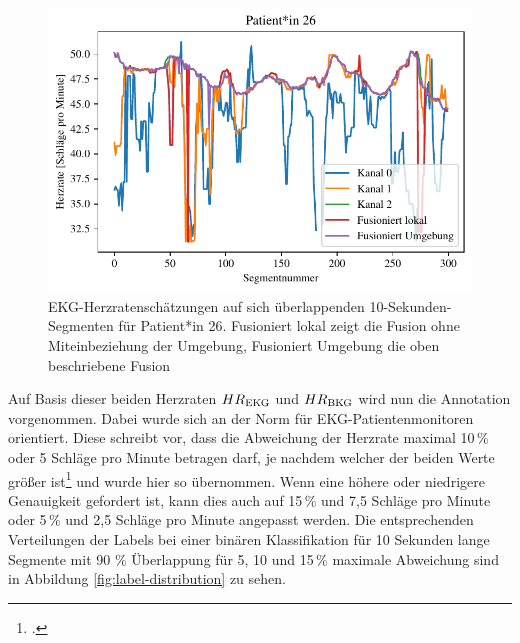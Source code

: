 	\begin{figure}[H]
		\centering
		\includegraphics{pic/ecg-patient-26.pdf}
		\caption[\ac{EKG}-Herzratenschätzungen auf sich überlappenden 10-Sekunden-Segmenten für Patient*in 26]{\ac{EKG}-Herzratenschätzungen auf sich überlappenden 10-Sekunden-Segmenten für Patient*in 26. Fusioniert lokal zeigt die Fusion ohne Miteinbeziehung der Umgebung, Fusioniert Umgebung die oben beschriebene Fusion}
		\label{fig:ecg-patient-26}
	\end{figure}


	Auf Basis dieser beiden Herzraten $HR\textsubscript{EKG}$ und $HR\textsubscript{BKG}$ wird nun die Annotation vorgenommen. Dabei wurde sich an der Norm für \ac{EKG}-Patientenmonitoren orientiert. Diese schreibt vor, dass die Abweichung der Herzrate maximal 10\,\% oder 5 Schläge pro Minute betragen darf, je nachdem welcher der beiden Werte größer ist\footcite[]{DIN} und wurde hier so übernommen. Wenn eine höhere oder niedrigere Genauigkeit gefordert ist, kann dies auch auf 15\,\% und 7{,}5 Schläge pro Minute oder 5\,\% und 2{,}5 Schläge pro Minute angepasst werden. Die entsprechenden Verteilungen der Labels bei einer binären Klassifikation für 10 Sekunden lange Segmente mit 90 \% Überlappung für 5, 10 und 15\,\% maximale Abweichung sind in Abbildung \ref{fig:label-distribution} zu sehen.
	
